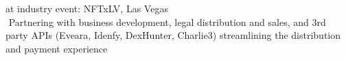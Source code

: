 \begin{cvtable}
{  at industry event: NFTxLV, Las Vegas \\
\textperiodcentered $ $ Partnering with %
business development,
legal
distribution and sales,
  and 3rd party APIs (Eveara, Idenfy, DexHunter, Charlie3)
  streamlining the distribution and payment experience %
} \\

%

\end{cvtable}
